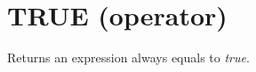 
\section{TRUE (operator)}\label{true:trueoperator}\hypertarget{true:trueoperator}{}
Returns an expression always equals to \emph{true}.

